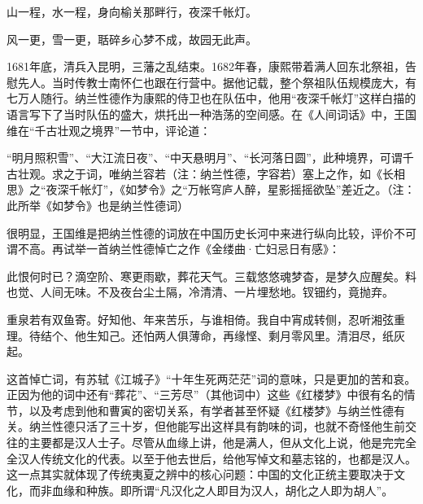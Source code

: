 
\begin{bookquote}山一程，水一程，身向榆关那畔行，夜深千帐灯。\end{bookquote}


\begin{bookquote}风一更，雪一更，聒碎乡心梦不成，故园无此声。\end{bookquote}


1681年底，清兵入昆明，三藩之乱结束。1682年春，康熙带着满人回东北祭祖，告慰先人。当时传教士南怀仁也跟在行营中。据他记载，整个祭祖队伍规模庞大，有七万人随行。纳兰性德作为康熙的侍卫也在队伍中，他用“夜深千帐灯”这样白描的语言写下了当时队伍的盛大，烘托出一种浩荡的空间感。在《人间词话》中，王国维在“千古壮观之境界”一节中，评论道：



\begin{bookquote}“明月照积雪”、“大江流日夜”、“中天悬明月”、“长河落日圆”，此种境界，可谓千古壮观。求之于词，唯纳兰容若（注：纳兰性德，字容若）塞上之作，如《长相思》之“夜深千帐灯”，《如梦令》之“万帐穹庐人醉，星影摇摇欲坠”差近之。（注：此所举《如梦令》也是纳兰性德词）\end{bookquote}


很明显，王国维是把纳兰性德的词放在中国历史长河中来进行纵向比较，评价不可谓不高。再试举一首纳兰性德悼亡之作《金缕曲·亡妇忌日有感》：



\begin{bookquote}此恨何时已？滴空阶、寒更雨歇，葬花天气。三载悠悠魂梦杳，是梦久应醒矣。料也觉、人间无味。不及夜台尘土隔，冷清清、一片埋愁地。钗钿约，竟抛弃。\end{bookquote}


\begin{bookquote}重泉若有双鱼寄。好知他、年来苦乐，与谁相倚。我自中宵成转侧，忍听湘弦重理。待结个、他生知己。还怕两人俱薄命，再缘悭、剩月零风里。清泪尽，纸灰起。\end{bookquote}


这首悼亡词，有苏轼《江城子》“十年生死两茫茫”词的意味，只是更加的苦和哀。正因为他的词中还有“葬花”、“三芳尽”（其他词中）这些《红楼梦》中很有名的情节，以及考虑到他和曹寅的密切关系，有学者甚至怀疑《红楼梦》与纳兰性德有关。纳兰性德只活了三十岁，但他能写出这样具有韵味的词，也就不奇怪他生前交往的主要都是汉人士子。尽管从血缘上讲，他是满人，但从文化上说，他是完完全全汉人传统文化的代表。以至于他去世后，给他写悼文和墓志铭的，也都是汉人。这一点其实就体现了传统夷夏之辨中的核心问题：中国的文化正统主要取决于文化，而非血缘和种族。即所谓“凡汉化之人即目为汉人，胡化之人即为胡人”。


